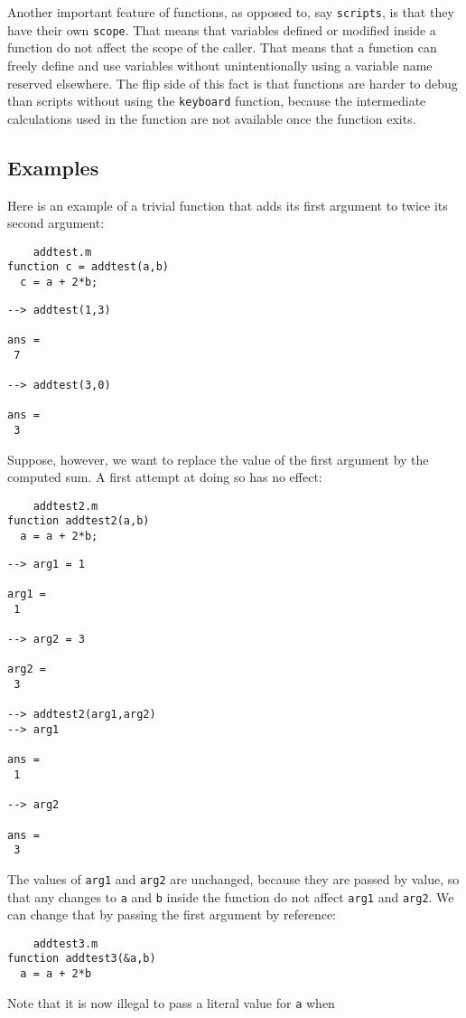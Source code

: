 Another important feature of functions, as opposed to, say \verb|scripts|,
is that they have their own \verb|scope|.  That means that variables
defined or modified inside a function do not affect the scope of the
caller.  That means that a function can freely define and use variables
without unintentionally using a variable name reserved elsewhere.  The
flip side of this fact is that functions are harder to debug than
scripts without using the \verb|keyboard| function, because the intermediate
calculations used in the function are not available once the function
exits.
\subsection{Examples}

Here is an example of a trivial function that adds its
first argument to twice its second argument:
\begin{verbatim}
    addtest.m
function c = addtest(a,b)
  c = a + 2*b;
\end{verbatim}
\begin{verbatim}
--> addtest(1,3)

ans = 
 7 

--> addtest(3,0)

ans = 
 3 
\end{verbatim}
Suppose, however, we want to replace the value of the first 
argument by the computed sum.  A first attempt at doing so
has no effect:
\begin{verbatim}
    addtest2.m
function addtest2(a,b)
  a = a + 2*b;
\end{verbatim}
\begin{verbatim}
--> arg1 = 1

arg1 = 
 1 

--> arg2 = 3

arg2 = 
 3 

--> addtest2(arg1,arg2)
--> arg1

ans = 
 1 

--> arg2

ans = 
 3 
\end{verbatim}
The values of \verb|arg1| and \verb|arg2| are unchanged, because they are
passed by value, so that any changes to \verb|a| and \verb|b| inside 
the function do not affect \verb|arg1| and \verb|arg2|.  We can change
that by passing the first argument by reference:
\begin{verbatim}
    addtest3.m
function addtest3(&a,b)
  a = a + 2*b
\end{verbatim}
Note that it is now illegal to pass a literal value for \verb|a| when
